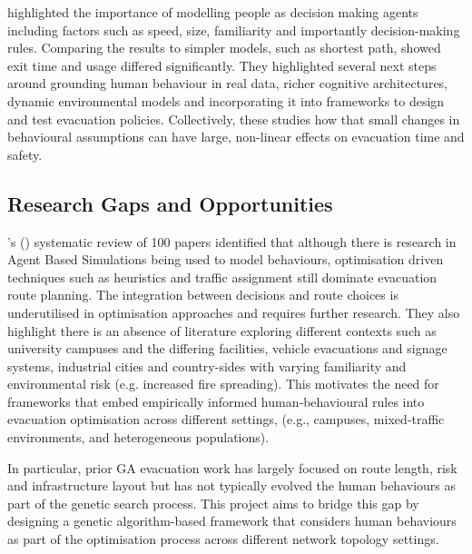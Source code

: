 \documentclass[12pt,a4paper]{report}
\begin{document}
\cite{SAHIN_2019_MODELLING_HUMAN} highlighted the importance of modelling people as decision making agents including factors such as speed, size, familiarity and importantly decision-making rules. Comparing the results to simpler models, such as shortest path, showed exit time and usage differed significantly. They highlighted several next steps around grounding human behaviour in real data, richer cognitive architectures, dynamic environmental models and incorporating it into frameworks to design and test evacuation policies. Collectively, these studies how that small changes in behavioural assumptions can have large, non-linear effects on evacuation time and safety.

\subsection{Research Gaps and Opportunities}
\citeauthor{ALDAHLAWI_2024}'s (\citeyear{ALDAHLAWI_2024}) systematic review of 100 papers identified that although there is research in Agent Based Simulations being used to model behaviours, optimisation driven techniques such as heuristics and traffic assignment still dominate evacuation route planning. The integration between decisions and route choices is underutilised in optimisation approaches and requires further research. They also highlight there is an absence of literature exploring different contexts such as university campuses and the differing facilities, vehicle evacuations and signage systems, industrial cities and country-sides with varying familiarity and environmental risk (e.g. increased fire spreading). This motivates the need for frameworks that embed empirically informed human‑behavioural rules into evacuation optimisation across different settings, (e.g., campuses, mixed‑traffic environments, and heterogeneous populations).

In particular, prior GA evacuation work has largely focused on route length, risk and infrastructure layout but has not typically evolved the human behaviours as part of the genetic search process. This project aims to bridge this gap by designing a genetic algorithm-based framework that considers human behaviours as part of the optimisation process across different network topology settings.
\end{document}
